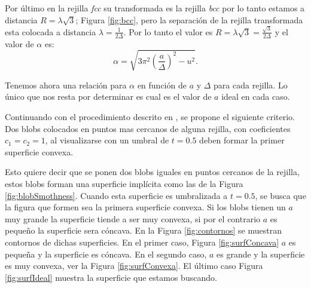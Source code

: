 Por último en la rejilla \emph{fcc} su transformada es la rejilla \emph{bcc} por lo tanto estamos a distancia $R = \lambda\sqrt{3}$; Figura \ref{fig:bcc}, pero la separación de la rejilla transformada esta colocada a distancia $\lambda = \frac{1}{2 \Delta}$. Por lo tanto el valor es $R = \lambda\sqrt{3} = \frac{\sqrt{3}}{2\Delta}$ y el valor de $\alpha$ es: 
\begin{equation}
  \alpha = \sqrt{3 \pi^2 \left( \frac{a}{\Delta} \right) ^2 - u^2}.
  \label{ec:deltaFCC}
\end{equation}

Tenemos ahora una relación para $\alpha$ en función de $a$ y $\Delta$ para cada rejilla. Lo único que nos resta por determinar es cual es el valor de $a$ ideal en cada caso.

Continuando con el procedimiento descrito en \cite{EdgarOptimization}, se propone el siguiente criterio. Dos blobs colocados en puntos mas cercanos de alguna rejilla, con coeficientes $c_1 = c_2 = 1$, al visualizarse con un umbral de $t = 0.5$ deben formar la primer superficie convexa.

Esto quiere decir que se ponen dos blobs iguales en puntos cercanos de la rejilla, estos blobs forman una superficie implícita como las de la Figura \ref{fig:blobSmothness}. Cuando esta superficie es umbralizada a $t = 0.5$, se busca que la figura que formen sea la primera superficie convexa. Si los blobs tienen un $a$ muy grande la superficie tiende a ser muy convexa, si por el contrario $a$ es pequeño la superficie sera cóncava. En la Figura \ref{fig:contornos} se muestran contornos de dichas superficies. En el primer caso, Figura \ref{fig:surfConcava} $a$ es pequeña y la superficie es cóncava. En el segundo caso, $a$ es grande y la superficie es muy convexa, ver la Figura \ref{fig:surfConvexa}. El último caso Figura \ref{fig:surfIdeal} muestra la superficie que estamos buscando.

